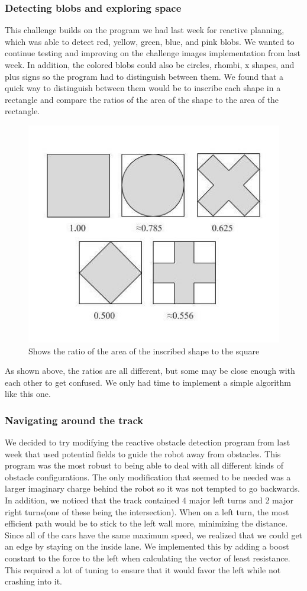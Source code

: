 \documentclass[journal, a4paper]{IEEEtran}
\begin{document}
\subsubsection{Detecting blobs and exploring space}
This challenge builds on the program we had last week for reactive planning, which was able to detect red, yellow, green, blue, and pink blobs. We wanted to continue testing and improving on the challenge images implementation from last week. In addition, the colored blobs could also be circles, rhombi, x shapes, and plus signs so the program had to distinguish between them. We found that a quick way to distinguish between them would be to inscribe each shape in a rectangle and compare the ratios of the area of the shape to the area of the rectangle. \\
\begin{figure}[H]
\includegraphics[scale=.50]{ratios.jpg}
\caption{Shows the ratio of the area of the inscribed shape to the square} 
\end{figure}
As shown above, the ratios are all different, but some may be close enough with each other to get confused. We only had time to implement a simple algorithm like this one. 
\subsubsection{Navigating around the track}
We decided to try modifying the reactive obstacle detection program from last week that used potential fields to guide the robot away from obstacles. This program was the most robust to being able to deal with all different kinds of obstacle configurations. The only modification that seemed to be needed was a larger imaginary charge behind the robot so it was not tempted to go backwards. In addition, we noticed that the track contained 4 major left turns and 2 major right turns(one of these being the intersection). When on a left turn, the most efficient path would be to stick to the left wall more, minimizing the distance. Since all of the cars have the same maximum speed, we realized that we could get an edge by staying on the inside lane. We implemented this by adding a boost constant to the force to the left when calculating the vector of least resistance. This required a lot of tuning to ensure that it would favor the left while not crashing into it. 
\end{document}
